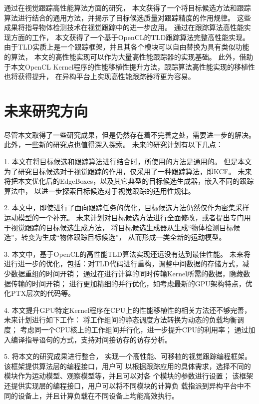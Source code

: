 通过在视觉跟踪高性能算法方面的研究，
本文获得了一个将目标候选方法和跟踪算法进行结合的通用方法，并揭示了目标候选质量对跟踪精度的作用规律。
这些成果将指导物体检测技术在视觉跟踪中的进一步应用。
通过在跟踪算法高性能实现方面的工作，
本文获得了一个基于OpenCL的TLD跟踪算法完整高性能实现。
由于TLD实质上是一个跟踪框架，并且其各个模块可以自由替换为具有类似功能的算法，
本文的高性能实现可以作为大量高性能跟踪器的实现基础。
此外，借助于本文OpenCL Kernel程序的性能移植性提升方法，跟踪算法高性能实现的移植性也将获得提升，
在异构平台上实现高性能跟踪器将更为容易。

\section{未来研究方向}
尽管本文取得了一些研究成果，但是仍然存在着不完善之处，需要进一步的解决。
此外，一些新的研究点也值得深入探索。
未来的研究计划有以下几点：
\begin{compactitem}
\item[1.]
本文在将目标候选和跟踪算法进行结合时，所使用的方法是通用的。
但是本文为了研究目标候选对于视觉跟踪的作用，仅采用了一种跟踪算法，即KCF。
未来将把本文优化后的EdgeBoxes，以及其它典型的目标候选生成器，嵌入不同的跟踪算法中，
以进一步探索目标候选对于视觉跟踪的适用性规律。

\item[2.]
本文中，即使进行了面向跟踪任务的优化，目标候选方法仍然仅作为密集采样运动模型的一个补充。
未来计划对目标候选方法进行全面修改，或者提出专门用于视觉跟踪的目标候选生成方法，
将目标候选生成器从生成``物体检测目标候选''，转变为生成``物体跟踪目标候选''，
从而形成一类全新的运动模型。

\item[3.]	
本文中，基于OpenCL的高性能TLD算法实现还远没有达到最佳性能。
未来将进行进一步的优化，包括：对TLD代码进行重构，调整中间数据的存储方式，减少数据重组的时间开销；
通过在进行计算的同时传输Kernel所需的数据，隐藏数据传输的时间开销；
进行更加精细的并行优化，如考虑最新的GPU架构特点，优化PTX层次的代码等。

\item[4.]	
本文提升GPU特定Kernel程序在CPU上的性能移植性的相关方法还不够完善，
未来计划进行如下工作：
将工作组间的静态调度方法转换为动态的负载均衡调度；
考虑同一个CPU核上的工作组间并行化，进一步提升CPU的利用率；
通过加入编译指导语句的方式，支持对间接访存的访存分析。

\item[5.]	
将本文的研究成果进行整合，
实现一个高性能、可移植的视觉跟踪编程框架。
该框架提供算法层的编程接口，用户可
以根据跟踪应用的具体需求，选择不同的模块作为运动模型、观察模型等，并且可以对各
个模块的参数进行设置；
该框架还提供实现层的编程接口，用户可以将不同模块的计算负
载指派到异构平台中不同的设备上，并且计算负载在不同设备上均能高效执行。
\end{compactitem}

